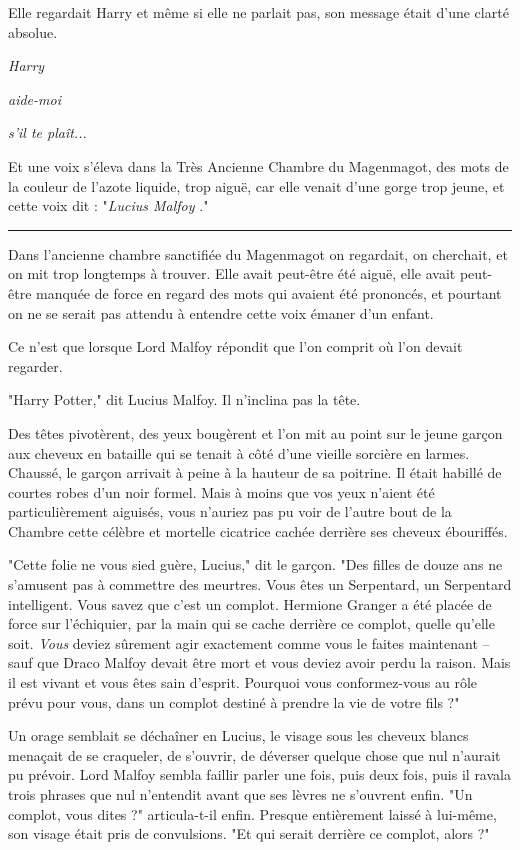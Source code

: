 Elle regardait Harry et même si elle ne parlait pas, son message était d'une clarté absolue.

\emph{Harry} 

\emph{aide-moi} 

\emph{s'il te plaît...} 

Et une voix s'éleva dans la Très Ancienne Chambre du Magenmagot, des mots de la couleur de l'azote liquide, trop aiguë, car elle venait d'une gorge trop jeune, et cette voix dit : "\emph{Lucius Malfoy} ."
\par\noindent\rule{\textwidth}{0.4pt}
Dans l'ancienne chambre sanctifiée du Magenmagot on regardait, on cherchait, et on mit trop longtemps à trouver. Elle avait peut-être été aiguë, elle avait peut-être manquée de force en regard des mots qui avaient été prononcés, et pourtant on ne se serait pas attendu à entendre cette voix émaner d'un enfant.

Ce n'est que lorsque Lord Malfoy répondit que l'on comprit où l'on devait regarder.

"Harry Potter," dit Lucius Malfoy. Il n'inclina pas la tête.

Des têtes pivotèrent, des yeux bougèrent et l'on mit au point sur le jeune garçon aux cheveux en bataille qui se tenait à côté d'une vieille sorcière en larmes. Chaussé, le garçon arrivait à peine à la hauteur de sa poitrine. Il était habillé de courtes robes d'un noir formel. Mais à moins que vos yeux n'aient été particulièrement aiguisés, vous n'auriez pas pu voir de l'autre bout de la Chambre cette célèbre et mortelle cicatrice cachée derrière ses cheveux ébouriffés.

"Cette folie ne vous sied guère, Lucius," dit le garçon. "Des filles de douze ans ne s'amusent pas à commettre des meurtres. Vous êtes un Serpentard, un Serpentard intelligent. Vous savez que c'est un complot. Hermione Granger a été placée de force sur l'échiquier, par la main qui se cache derrière ce complot, quelle qu'elle soit. \emph{Vous}  deviez sûrement agir exactement comme vous le faites maintenant – sauf que Draco Malfoy devait être mort et vous deviez avoir perdu la raison. Mais il est vivant et vous êtes sain d'esprit. Pourquoi vous conformez-vous au rôle prévu pour vous, dans un complot destiné à prendre la vie de votre fils ?"

Un orage semblait se déchaîner en Lucius, le visage sous les cheveux blancs menaçait de se craqueler, de s'ouvrir, de déverser quelque chose que nul n'aurait pu prévoir. Lord Malfoy sembla faillir parler une fois, puis deux fois, puis il ravala trois phrases que nul n'entendit avant que ses lèvres ne s'ouvrent enfin. "Un complot, vous dites ?" articula-t-il enfin. Presque entièrement laissé à lui-même, son visage était pris de convulsions. "Et qui serait derrière ce complot, alors ?"


